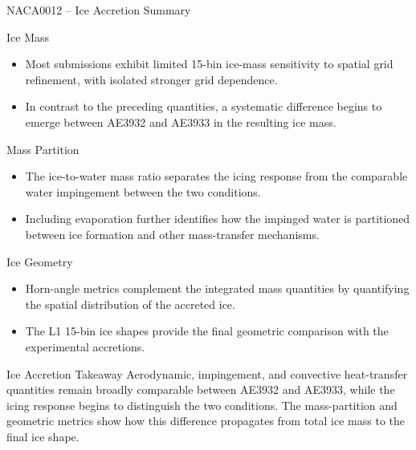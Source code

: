 
\begin{frame}[shrink]{\small NACA0012 -- Ice Accretion Summary}
\scriptsize

\begin{block}{\scriptsize Ice Mass}
\begin{itemize}
    \item Most submissions exhibit limited 15-bin ice-mass sensitivity to spatial grid refinement, with isolated stronger grid dependence.
    \item In contrast to the preceding quantities, a systematic difference begins to emerge between AE3932 and AE3933 in the resulting ice mass.
\end{itemize}
\end{block}

\vspace{0.15cm}

\begin{block}{\scriptsize Mass Partition}
\begin{itemize}
    \item The ice-to-water mass ratio separates the icing response from the comparable water impingement between the two conditions.
    \item Including evaporation further identifies how the impinged water is partitioned between ice formation and other mass-transfer mechanisms.
\end{itemize}
\end{block}

\vspace{0.15cm}

\begin{block}{\scriptsize Ice Geometry}
\begin{itemize}
    \item Horn-angle metrics complement the integrated mass quantities by quantifying the spatial distribution of the accreted ice.
    \item The L1 15-bin ice shapes provide the final geometric comparison with the experimental accretions.
\end{itemize}
\end{block}

\vspace{0.15cm}

\begin{alertblock}{\scriptsize Ice Accretion Takeaway}
Aerodynamic, impingement, and convective heat-transfer quantities remain broadly comparable between AE3932 and AE3933, while the icing response begins to distinguish the two conditions. The mass-partition and geometric metrics show how this difference propagates from total ice mass to the final ice shape.
\end{alertblock}

\end{frame}


